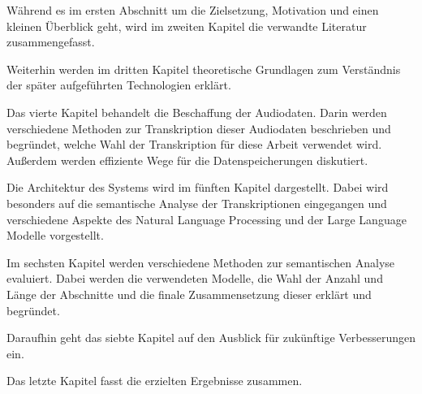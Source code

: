 Während es im ersten Abschnitt um die Zielsetzung, Motivation und einen kleinen Überblick geht, wird im zweiten Kapitel die verwandte Literatur zusammengefasst.

Weiterhin werden im dritten Kapitel theoretische Grundlagen zum Verständnis der später aufgeführten Technologien erklärt.

Das vierte Kapitel behandelt die Beschaffung der Audiodaten.
Darin werden verschiedene Methoden zur Transkription dieser Audiodaten beschrieben und begründet, welche Wahl der Transkription für diese Arbeit verwendet wird.
Außerdem werden effiziente Wege für die Datenspeicherungen diskutiert.

Die Architektur des Systems wird im fünften Kapitel dargestellt. 
Dabei wird besonders auf die semantische Analyse der Transkriptionen eingegangen und verschiedene Aspekte des Natural Language Processing und der Large Language Modelle vorgestellt.

Im sechsten Kapitel werden verschiedene Methoden zur semantischen Analyse evaluiert.
Dabei werden die verwendeten Modelle, die Wahl der Anzahl und Länge der Abschnitte und die finale Zusammensetzung dieser erklärt und begründet.

Daraufhin geht das siebte Kapitel auf den Ausblick für zukünftige Verbesserungen ein.

Das letzte Kapitel fasst die erzielten Ergebnisse zusammen.
